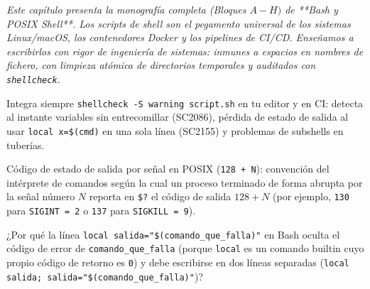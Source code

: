 \documentclass{book}
\begin{document}
\noindent\textit{Este capítulo presenta la monografía completa (Bloques \(A-H)\) de **Bash y POSIX Shell**. Los scripts de shell son el pegamento universal de los sistemas Linux/macOS, los contenedores Docker y los pipelines de CI/CD. Enseñamos a escribirlos con rigor de ingeniería de sistemas: inmunes a espacios en nombres de fichero, con limpieza atómica de directorios temporales y auditados con \texttt{shellcheck}.}

\begin{tcolorbox}[title={Consejo}, studiumtip, breakable]

Integra siempre \texttt{shellcheck -S warning script.sh} en tu editor y en CI: detecta al instante variables sin entrecomillar (SC2086), pérdida de estado de salida al usar \texttt{local x=\$(cmd)} en una sola línea (SC2155) y problemas de subshells en tuberías.
\end{tcolorbox}

\begin{tcolorbox}[title={Definición}, studiumdef, breakable]

Código de estado de salida por señal en POSIX (\texttt{128 + N}): convención del intérprete de comandos según la cual un proceso terminado de forma abrupta por la señal número \(N\) reporta en \texttt{\$?} el código de salida \(128 + N\) (por ejemplo, \texttt{130} para \texttt{SIGINT = 2} o \texttt{137} para \texttt{SIGKILL = 9}).
\end{tcolorbox}

\begin{tcolorbox}[title={Autoficha}, studiumcheck, breakable]

¿Por qué la línea \texttt{local salida="\$(comando\_que\_falla)"} en Bash oculta el código de error de \texttt{comando\_que\_falla} (porque \texttt{local} es un comando builtin cuyo propio código de retorno es \texttt{0}) y debe escribirse en dos líneas separadas (\texttt{local salida; salida="\$(comando\_que\_falla)"})?
\end{tcolorbox}
\end{document}
